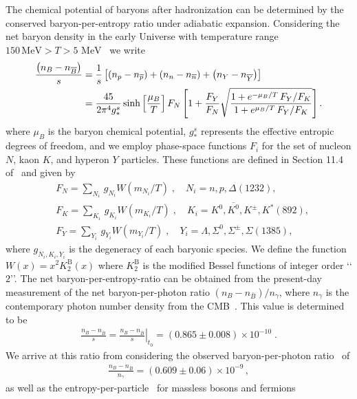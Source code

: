 \documentclass[universe,article,submit,moreauthors,pdftex,a4paper]{Definitions/mdpi}
\newcommand{\MeV}{\text{ MeV}}
\begin{document}
The chemical potential of baryons after hadronization can be determined by the conserved baryon-per-entropy ratio under adiabatic expansion. Considering the net baryon density in the early Universe with temperature range $150\,\mathrm{MeV}>T>5\MeV$~\cite{Yang:2021bko} we write
\begin{align}\label{Baryon_ChemicalPotential}
\frac{\left(n_B-n_{\overline{B}}\right)}{s}&=\frac{1}{s}\left[\left(n_p-n_{\overline{p}}\right)+\left(n_n-n_{\overline{n}}\right)+\left(n_Y-n_{\overline{Y}}\right)\right]\notag\\
&=\frac{45}{2\pi^4g^s_\ast}\sinh\left[\frac{\mu_B}{T}\right]F_N\left[1+\frac{F_Y}{F_N}\sqrt{\frac{1+e^{-\mu_B/T}\,F_Y/F_K}{1+e^{\mu_B/T}\,F_Y/F_K}}\right].
\end{align}
where $\mu_{B}$ is the baryon chemical potential, $g_{*}^{s}$ represents the effective entropic degrees of freedom, and we employ phase-space functions $F_i$ for the set of nucleon $N$, kaon $K$, and hyperon $Y$ particles. These functions are defined in Section 11.4 of~\cite{Letessier:2002ony} and given by
\begin{align}
&F_N=\sum_{N_i}\,g_{N_i}W(m_{N_i}/T)\;, \quad N_i=n, p, \Delta(1232),\\
&F_K=\sum_{K_i}\,g_{K_i}W(m_{K_i}/T)\;, \quad K_i=K^0, \overline{K^0}, K^\pm, K^\ast(892),\\
&F_Y=\sum_{Y_i}\,g_{Y_i}W(m_{Y_i}/T)\;, \quad Y_i=\Lambda, \Sigma^0,\Sigma^\pm, \Sigma(1385),
\end{align}
where $g_{N_i,K_i,Y_i}$ is the degeneracy of each baryonic species. We define the function $W(x)=x^2K^\mathrm{B}_2(x)$ where $K^\mathrm{B}_2$ is the modified Bessel functions of integer order \lq\lq$2$\rq\rq. The net baryon-per-entropy-ratio can be obtained from the present-day measurement of the net baryon-per-photon ratio $\left(n_{B}-n_{\overline{B}}\right)/n_{\gamma}$, where $n_{\gamma}$ is the contemporary photon number density from the CMB~\cite{Yang:2021bko}. This value is determined to be
\begin{align}\label{BdS}
\frac{n_B-n_{\overline{B}}}{s}= \left.\frac{n_B-n_{\overline{B}}}{s}\right|_{t_0}=(0.865\pm0.008)\times10^{-10} \;.
\end{align}
We arrive at this ratio from considering the observed baryon-per-photon ratio~\cite{ParticleDataGroup:2018ovx} of
\begin{align}
 \frac{n_B-n_{\overline{B}}}{n_\gamma}= (0.609\pm0.06)\times10^{-9}\,, 
\end{align}
as well as the entropy-per-particle~\cite{Fromerth:2012fe} for massless bosons and fermions 
\end{document}
